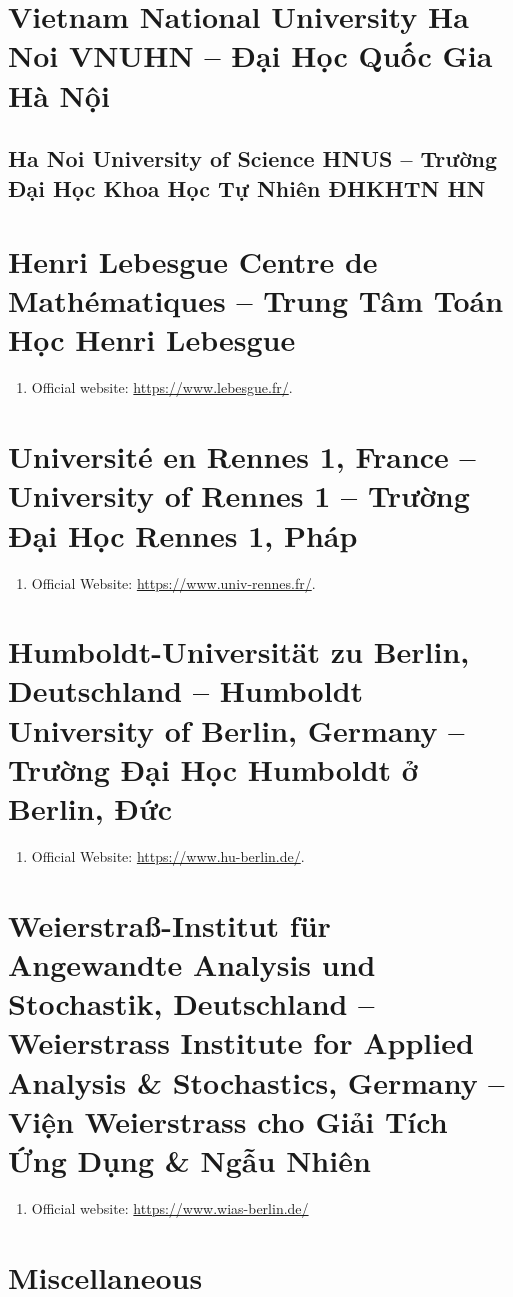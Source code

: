 \documentclass{article}
\begin{document}
\section{Vietnam National University Ha Noi VNUHN -- Đại Học Quốc Gia Hà Nội}

\subsection{Ha Noi University of Science HNUS -- Trường Đại Học Khoa Học Tự Nhiên ĐHKHTN HN}


\section{Henri Lebesgue Centre de Math\'ematiques -- Trung Tâm Toán Học Henri Lebesgue}
\begin{enumerate}
	\item Official website: \url{https://www.lebesgue.fr/}.
\end{enumerate}


\section{Universit\'e en Rennes 1, France -- University of Rennes 1 -- Trường Đại Học Rennes 1, Pháp}
\begin{enumerate}
	\item Official Website: \url{https://www.univ-rennes.fr/}.
\end{enumerate}


\section{Humboldt-Universität zu Berlin, Deutschland -- Humboldt University of Berlin, Germany -- Trường Đại Học Humboldt ở Berlin, Đức}
\begin{enumerate}
	\item Official Website: \url{https://www.hu-berlin.de/}.
\end{enumerate}



\section{Weierstraß-Institut für Angewandte Analysis und Stochastik, Deutschland -- Weierstrass Institute for Applied Analysis \& Stochastics, Germany -- Viện Weierstrass cho Giải Tích Ứng Dụng \& Ngẫu Nhiên}
\begin{enumerate}
	\item Official website: \url{https://www.wias-berlin.de/}
\end{enumerate}


\section{Miscellaneous}


\printbibliography[heading=bibintoc]
	
\end{document}
